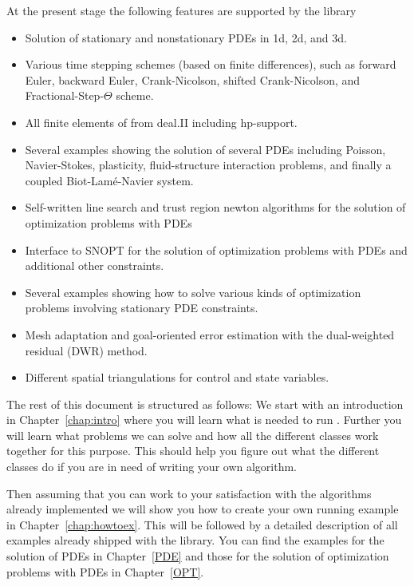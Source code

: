 At the present stage the following features are supported by the library
\begin{itemize}
\item Solution of stationary and nonstationary PDEs in 1d, 2d, and 3d.
\item Various time stepping schemes (based on finite differences), 
  such as forward Euler, backward Euler,
  Crank-Nicolson, shifted Crank-Nicolson, and Fractional-Step-$\Theta$ scheme.
\item All finite elements of from deal.II including hp-support.
\item Several examples showing the solution of several PDEs including
   Poisson, Navier-Stokes, plasticity, fluid-structure interaction problems,
and finally a coupled Biot-Lam\'e-Navier system.
\item Self-written line search and trust region newton algorithms for the 
   solution of optimization problems with PDEs \cite{NoWr00}
\item Interface to SNOPT for the solution of optimization problems with PDEs and
  additional other constraints.
\item Several examples showing how to solve various kinds of optimization problems
  involving stationary PDE constraints.
\item Mesh adaptation and goal-oriented error estimation with
the dual-weighted residual (DWR) method.
\item Different spatial triangulations for control and state variables.
\end{itemize}


The rest of this document is structured as follows: We start with an introduction in
Chapter~\ref{chap:intro} where you will learn what is needed to run \dope{}. 
Further you will learn what problems we can solve and how all the different classes 
work together for this purpose. This should help you figure out what the different classes
do if you are in need of writing your own algorithm.

Then assuming that you can work to your satisfaction with the algorithms already implemented
we will show you how to create your own running example in Chapter~\ref{chap:howtoex}.
This will be followed by a detailed description of all examples already shipped with 
the library. You can find the examples for the solution of PDEs in Chapter~\ref{PDE}
and those for the solution of optimization problems with PDEs in Chapter~\ref{OPT}.

